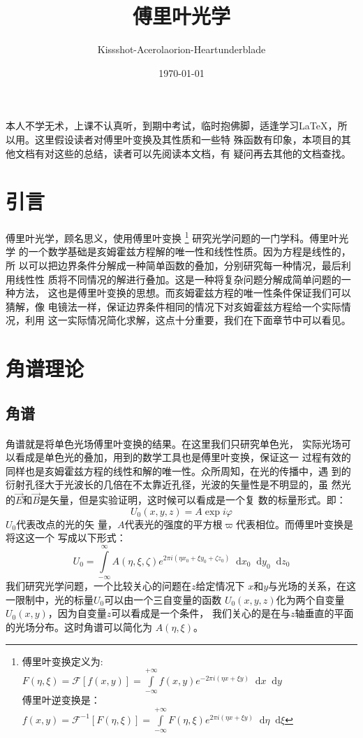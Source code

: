 \documentclass{article}
\title{傅里叶光学}
\author{Kissshot-Acerolaorion-Heartunderblade}
\date{\today}
\newcommand*{\dif}{\mathop{}\!\mathrm{d}}
\begin{document}
\maketitle
\tableofcontents
本人不学无术，上课不认真听，到期中考试，临时抱佛脚，适逢学习\LaTeX，所
以用。这里假设读者对傅里叶变换及其性质和一些特
殊函数有印象，本项目的其他文档有对这些的总结，读者可以先阅读本文档，有
疑问再去其他的文档查找。
\section{引言}
\paragraph{}
傅里叶光学，顾名思义，使用傅里叶变换
\footnote{
  傅里叶变换定义为:$F(\eta,\xi)=\mathscr{F}[f(x,y)]=\int\limits_{-\infty}^{+\infty}f(x,y)e^{-2\pi i(\eta x+\xi y)}\dif x\dif y$\\
  傅里叶逆变换是：
  $f(x,y)=\mathscr{F}^{-1}[F(\eta,\xi)]=\int\limits_{-\infty}^{+\infty}F(\eta,\xi)e^{2\pi
    i(\eta x+\xi y)}\dif \eta\dif\xi$
}
研究光学问题的一门学科。傅里叶光学
的一个数学基础是亥姆霍兹方程解的唯一性和线性性质。因为方程是线性的，所
以可以把边界条件分解成一种简单函数的叠加，分别研究每一种情况，最后利用线性性
质将不同情况的解进行叠加。这是一种将复杂问题分解成简单问题的一种方法，
这也是傅里叶变换的思想。而亥姆霍兹方程的唯一性条件保证我们可以猜解，像
电镜法一样，保证边界条件相同的情况下对亥姆霍兹方程给一个实际情况，利用
这一实际情况简化求解，这点十分重要，我们在下面章节中可以看见。
\section{角谱理论}
\subsection{角谱}
\paragraph{}
角谱就是将单色光场傅里叶变换的结果。在这里我们只研究单色光，
实际光场可以看成是单色光的叠加，用到的数学工具也是傅里叶变换，保证这一
过程有效的同样也是亥姆霍兹方程的线性和解的唯一性。众所周知，在光的传播中，遇
到的衍射孔径大于光波长的几倍在不太靠近孔径，光波的矢量性是不明显的，虽
然光的$\vec{E}$和$\vec{B}$是矢量，但是实验证明，这时候可以看成是一个复
数的标量形式。即：\[U_0(x,y,z)=A\exp{i\varphi}\] $U_0$代表改点的光的矢
量，$A$代表光的强度的平方根$\varpi$代表相位。而傅里叶变换是将这这一个
写成以下形式：
\[U_0=\int\limits_{-\infty}^{\infty}A(\eta,\xi,\zeta)e^{2\pi i(\eta
    x_0+\xi y_0+\zeta z_0)}\dif x_0 \dif
  y_0 \dif z_0\]我们研究光学问题，一个比较关心的问题在$z$给定情况下
$x$和$y$与光场的关系，在这一限制中，光的标量$U_0$可以由一个三自变量的函数
$U_0(x,y,z)$化为两个自变量$U_0(x,y)$，因为自变量$z$可以看成是一个条件，
我们关心的是在与$z$轴垂直的平面的光场分布。这时角谱可以简化为
$A(\eta,\xi)$。
\end{document}
